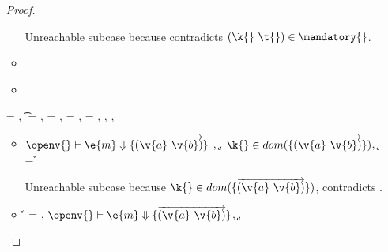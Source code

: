 \begin{lemma}
\begin{enumerate}
\begin{proof}
\begin{case}[T-GetHMap]
\begin{itemize}
\begin{subcase}[B-GetMissing]
       Unreachable subcase because 
       contradicts ${\inmandatory{\k{}}{\t{}}{\mandatory{}}}$.
      \end{subcase}
    \item[]
      \begin{subcase}[BE-Get1]
      \end{subcase}
    \item[]
      \begin{subcase}[BE-Get2]
      \end{subcase}
  \end{itemize}
\end{case}

\begin{case}[T-GetHMapAbsent]
  \e{} = { {}},
  \t{} = \Nil,
  \thenprop{\prop{}} = {\topprop{}},
  \elseprop{\prop{}} = {\topprop{}},
  \object{} = {\replacefor
               { {\x{}}}
                          {}
                          {\x{}}},
  \judgement {\propenv{}} { {\HMapgeneric {\mandatory{}} {\absent}}}
           { {}}
           {},
  \judgementtwo {\propenv{}} { {}},
  {\inabsent{\k{}}{\absent{}}}


  \begin{itemize}
    \item[]
      \begin{subcase}[B-Get]
        $\opsem {\openv{}}
        {\e{m}} {\curlymap{\overrightarrow{({\v{a}}\ {\v{b}})}}}$
        ,
         \opsem {\openv{}} {} {\k{}},
         $\keyinmap{\k{}}{\curlymap{\overrightarrow{({\v{a}}\ {\v{b}})}}}$,
          {\k{}} = {\v{}}

       Unreachable subcase because 
         $\keyinmap{\k{}}{\curlymap{\overrightarrow{({\v{a}}\ {\v{b}})}}}$,
         contradicts
                {\inabsent{\k{}}{\absent{}}}.
      \end{subcase}
    \item[]
      \begin{subcase}[B-GetMissing]
        \v{} = \nil,
        $\opsem {\openv{}}
        {\e{m}} {\curlymap{\overrightarrow{({\v{a}}\ {\v{b}})}}}$,
       \opsem {\openv{}} {} {\k{}},


\end{subcase}
\end{itemize}
\end{case}
\end{proof}
\end{enumerate}
\end{lemma}
